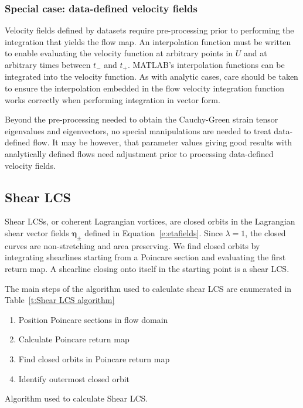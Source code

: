 \documentclass{article}
\begin{document}
\subsubsection{Special case: data-defined velocity fields}

Velocity fields defined by datasets require pre-processing prior to performing the integration that yields the flow map. An interpolation function must be written to enable evaluating the velocity function at arbitrary points in $U$ and at arbitrary times between $t_-$ and $t_+$. MATLAB's interpolation functions can be integrated into the velocity function. As with analytic cases, care should be taken to ensure the interpolation embedded in the flow velocity integration function works correctly when performing integration in vector form.

Beyond the pre-processing needed to obtain the Cauchy-Green strain tensor eigenvalues and eigenvectors, no special manipulations are needed to treat data-defined flow. It may be however, that parameter values giving good results with analytically defined flows need adjustment prior to processing data-defined velocity fields.

\subsection{Shear LCS}

Shear LCSs, or coherent Lagrangian vortices, are closed orbits in the Lagrangian shear vector fields $\boldsymbol \eta_{\pm}$ defined in Equation~\eqref{e:etafields}. Since $\lambda = 1$, the closed curves are non-stretching and area preserving. We find closed orbits by integrating shearlines starting from a Poincare section and evaluating the first return map. A shearline closing onto itself in the starting point is a shear LCS. 

The main steps of the algorithm used to calculate shear LCS are enumerated in Table~\ref{t:Shear LCS algorithm}

\begin{table}
\begin{enumerate}
\item Position Poincare sections in flow domain
\item Calculate Poincare return map
\item Find closed orbits in Poincare return map
\item Identify outermost closed orbit
\end{enumerate}
\caption{Algorithm used to calculate Shear LCS.}
\label{t:Shear LCS algorithm}
\end{table}
\end{document}
